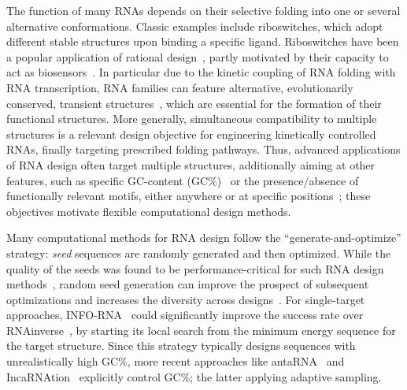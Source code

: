\documentclass[]{bmcart}
\newcommand{\Def}[1]{\emph{#1}}
\newcommand{\parHead}[1]{\Final{\paragraph{#1}}}
\newcommand{\Final}[1]{\begingroup\color{red!70!black}#1\endgroup}
\renewcommand{\Final}[1]{}
\newcommand{\Nuc}[1]{{\sf #1}}
\newcommand{\Cb}{\Nuc{C}}
\newcommand{\Gb}{\Nuc{G}}
\newcommand{\GCb}{\Gb\Cb}
\newcommand{\Software}[1]{{\ttfamily #1}}
\newcommand{\citep}[1]{\cite{#1}}
\newcommand{\citet}[1]{\cite{#1}}
\begin{document}
\parHead{Motivating multiple RNA design.} The function of many RNAs
depends on their selective folding into one or several alternative
conformations. Classic examples include riboswitches, which
adopt different stable structures upon binding a specific
ligand. Riboswitches have been a popular application of rational
design~\citep{Wachsmuth2013,Domin2017}, partly motivated by their
capacity to act as biosensors~\citep{Findeiss2017}.
In particular due to the kinetic coupling of RNA folding with RNA transcription, RNA families can feature alternative,
evolutionarily conserved, transient structures~\citep{Zhu2013}, which
are essential for the formation of their functional structures.  More generally, simultaneous compatibility to multiple
structures is a relevant design objective for engineering kinetically
controlled RNAs, finally targeting prescribed folding pathways. Thus,
advanced applications of RNA design often target multiple structures,
additionally aiming at other features, such as specific
\GCb-content (\GCb\%)~\citet{Reinharz2013} or the presence/absence of
functionally relevant motifs, either anywhere or at specific
positions~\citep{Zhou2013}; these objectives motivate flexible
computational design methods.

\parHead{On the importance of sampling for design.}
Many computational methods for RNA design follow the ``generate-and-optimize'' strategy: \Def{seed} sequences are randomly generated and then optimized.
While the quality of the seeds was
found to be performance-critical for such RNA design
methods~\citep{Levin2012}, random seed generation
can improve the prospect of subsequent optimizations
and increases the diversity
across designs~\citep{Reinharz2013}.  For single-target approaches,
\Software{INFO-RNA}~\citep{Busch2006} could significantly improve the success rate over \Software{RNAinverse}~\citep{Hofacker1994}, by starting its local search from the minimum energy sequence
for the target structure. Since this
strategy typically designs sequences with unrealistically high
\GCb\%,
more recent approaches like \Software{antaRNA}~\citep{Kleinkauf2015} and \Software{IncaRNAtion}~\citep{Reinharz2013} explicitly control \GCb\%; the latter applying adaptive sampling.
\end{document}
